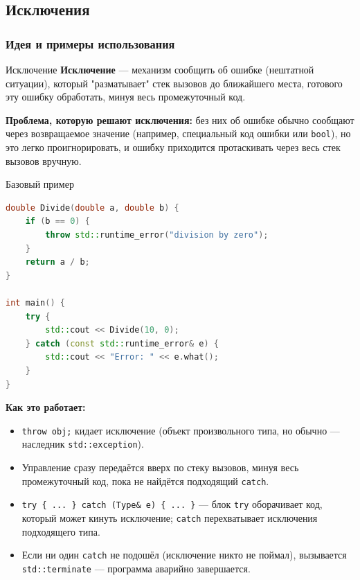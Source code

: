 \subsection{Исключения}
\subsubsection{Идея и примеры использования}
\begin{definition}{Исключение}{}
\textbf{Исключение} --- механизм сообщить об ошибке (нештатной ситуации), который "разматывает" стек вызовов до ближайшего места, готового эту ошибку обработать, минуя весь промежуточный код.
\end{definition}
\textbf{Проблема, которую решают исключения:} без них об ошибке обычно сообщают через возвращаемое значение (например, специальный код ошибки или \texttt{bool}), но это легко проигнорировать, и ошибку приходится протаскивать через весь стек вызовов вручную.
\begin{implementation}{Базовый пример}{}
\begin{lstlisting}[language=C++]
double Divide(double a, double b) {
    if (b == 0) {
        throw std::runtime_error("division by zero");
    }
    return a / b;
}

int main() {
    try {
        std::cout << Divide(10, 0);
    } catch (const std::runtime_error& e) {
        std::cout << "Error: " << e.what();
    }
}
\end{lstlisting}
\end{implementation}
\textbf{Как это работает:}
\begin{itemize}
  \item \texttt{throw obj;} кидает исключение (объект произвольного типа, но обычно --- наследник \texttt{std::exception}).
  \item Управление сразу передаётся вверх по стеку вызовов, минуя весь промежуточный код, пока не найдётся подходящий \texttt{catch}.
  \item \texttt{try \{ ... \} catch (Type\& e) \{ ... \}} --- блок \texttt{try} оборачивает код, который может кинуть исключение; \texttt{catch} перехватывает исключения подходящего типа.
  \item Если ни один \texttt{catch} не подошёл (исключение никто не поймал), вызывается \texttt{std::terminate} --- программа аварийно завершается.
\end{itemize}
